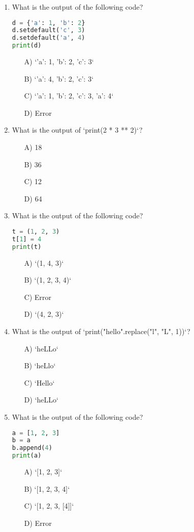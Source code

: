 \documentclass[9pt]{article}
\begin{document}
\begin{multicols}{2}
\begin{enumerate}
\item What is the output of the following code?
\begin{lstlisting}[language=Python]
d = {'a': 1, 'b': 2}
d.setdefault('c', 3)
d.setdefault('a', 4)
print(d)
\end{lstlisting}
\begin{enumerate}
\item[A)] `{'a': 1, 'b': 2, 'c': 3}`
\item[B)] `{'a': 4, 'b': 2, 'c': 3}`
\item[C)] `{'a': 1, 'b': 2, 'c': 3, 'a': 4}`
\item[D)] Error
\end{enumerate}

\item What is the output of `print(2 * 3 ** 2)`?
\begin{enumerate}
\item[A)] 18
\item[B)] 36
\item[C)] 12
\item[D)] 64
\end{enumerate}

\item What is the output of the following code?
\begin{lstlisting}[language=Python]
t = (1, 2, 3)
t[1] = 4
print(t)
\end{lstlisting}
\begin{enumerate}
\item[A)] `(1, 4, 3)`
\item[B)] `(1, 2, 3, 4)`
\item[C)] Error
\item[D)] `(4, 2, 3)`
\end{enumerate}

\item What is the output of `print("hello".replace("l", "L", 1))`?
\begin{enumerate}
\item[A)] `heLLo`
\item[B)] `heLlo`
\item[C)] `Hello`
\item[D)] `heLLo`
\end{enumerate}

\item What is the output of the following code?
\begin{lstlisting}[language=Python]
a = [1, 2, 3]
b = a
b.append(4)
print(a)
\end{lstlisting}
\begin{enumerate}
\item[A)] `[1, 2, 3]`
\item[B)] `[1, 2, 3, 4]`
\item[C)] `[1, 2, 3, [4]]`
\item[D)] Error
\end{enumerate}


\end{enumerate}
\end{multicols}
\end{document}
